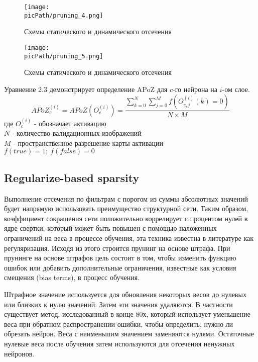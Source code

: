 \documentclass[oneside,final,12pt]{extreport}
\newcommand{\picPath}{images}
\begin{document}
\begin{figure}[H]
\begin{center}
  \texttt{[image: \\picPath/pruning\_4.png]}
  \caption{Схемы статического и динамического отсечения}
  \label{fig:pruning_4}
  \end{center}
\end{figure}


\begin{figure}[H]
\begin{center}
  \texttt{[image: \\picPath/pruning\_5.png]}
  \caption{Схемы статического и динамического отсечения}
  \label{fig:pruning_5}
  \end{center}
\end{figure}

Уравнение 2.3 демонстрирует определение APoZ для $c$-го нейрона на $i$-ом слое.
\begin{equation}
    APoZ_c^{(i)} = APoZ(O_c^{(i)}) = \frac{\sum_{k=0}^{N}\sum_{j=0}^{M}f(O_{c,j}^{(i)}(k)=0)}{N \times M}
\end{equation}
где $O_c^{(i)}$ - обозначает активацию\\
$N$ - количество валидационных изображений\\
$M$ - пространственное разрешение карты активации\\
$f(true) = 1;\ f(false) = 0$
\subsection{Regularize-based sparsity}
Выполнение отсечения по фильтрам с порогом из суммы абсолютных значений будет напрямую использовать преимущество структурной сети. Таким образом, коэффициент сокращения сети положительно коррелирует с процентом нулей в ядре свертки, который может быть повышен с помощью наложенных ограничений на веса в процессе обучения, эта техника известна в литературе как регуляризация. Исходя из этого строится прунинг на основе штрафа. При прунинге на основе штрафов цель состоит в том, чтобы изменить функцию ошибок или добавить дополнительные ограничения, известные как условия смещения (bias terms), в процесс обучения. 

Штрафное значение используется для обновления некоторых весов до нулевых или близких к нулю значений. Затем эти значения удаляются. В частности существует метод, исследованный в конце 80х, который использует уменьшение веса при обратном распространении ошибки, чтобы определить, нужно ли обрезать нейрон. Веса с наименьшим значением заменяются нулями. Остаточные нулевые веса после обучения затем используются для отсечения ненужных нейронов.
\end{document}
